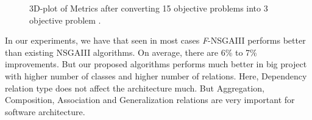 \documentclass[letterpaper, 10 pt, conference]{ieeeconf}  %
\begin{document}
\begin{figure}[h] 
\centering 
 
	\hspace{0em}	
\caption{3D-plot of Metrics after converting 15 objective problems into 3 objective problem .}
\label{fig:dtlz710figure3d}
\end{figure}



In our experiments, we have that seen in most cases \textit{F}-NSGAIII performs better than existing NSGAIII algorithms. 
On average, there are 6\% to 7\% improvements. But our proposed algorithms performs much better in big project with higher number of classes and higher number of relations. Here, Dependency relation type  does not affect the architecture much. But Aggregation, Composition, Association and Generalization relations are very important for software architecture.
\end{document}
